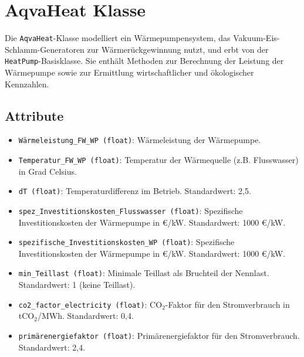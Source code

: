 \section{AqvaHeat Klasse}
Die \texttt{AqvaHeat}-Klasse modelliert ein Wärmepumpensystem, das Vakuum-Eis-Schlamm-Generatoren zur Wärmerückgewinnung nutzt, und erbt von der \texttt{HeatPump}-Basisklasse. Sie enthält Methoden zur Berechnung der Leistung der Wärmepumpe sowie zur Ermittlung wirtschaftlicher und ökologischer Kennzahlen.

\subsection{Attribute}
\begin{itemize}
    \item \texttt{Wärmeleistung\_FW\_WP (float)}: Wärmeleistung der Wärmepumpe.
    \item \texttt{Temperatur\_FW\_WP (float)}: Temperatur der Wärmequelle (z.B. Flusswasser) in Grad Celsius.
    \item \texttt{dT (float)}: Temperaturdifferenz im Betrieb. Standardwert: 2,5.
    \item \texttt{spez\_Investitionskosten\_Flusswasser (float)}: Spezifische Investitionskosten der Wärmepumpe in €/kW. Standardwert: 1000 €/kW.
    \item \texttt{spezifische\_Investitionskosten\_WP (float)}: Spezifische Investitionskosten der Wärmepumpe in €/kW. Standardwert: 1000 €/kW.
    \item \texttt{min\_Teillast (float)}: Minimale Teillast als Bruchteil der Nennlast. Standardwert: 1 (keine Teillast).
    \item \texttt{co2\_factor\_electricity (float)}: CO$_2$-Faktor für den Stromverbrauch in tCO$_2$/MWh. Standardwert: 0,4.
    \item \texttt{primärenergiefaktor (float)}: Primärenergiefaktor für den Stromverbrauch. Standardwert: 2,4.
\end{itemize}

